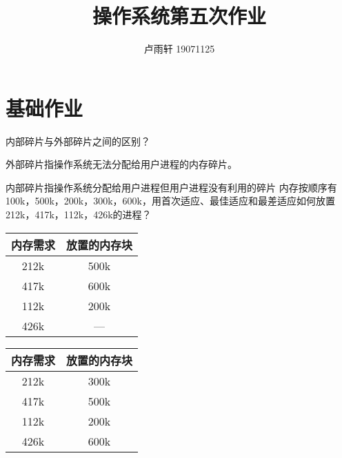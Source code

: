 \documentclass{ctexart}
\title{操作系统第五次作业}
\author{卢雨轩 19071125}
\begin{document}
\maketitle

\section*{基础作业}

\begin{outline}[enumerate]
    \1 内部碎片与外部碎片之间的区别？
        
        外部碎片指操作系统无法分配给用户进程的内存碎片。

        内部碎片指操作系统分配给用户进程但用户进程没有利用的碎片
    \1 内存按顺序有100k，500k，200k，300k，600k，用首次适应、最佳适应和最差适应如何放置212k，417k，112k，426k的进程？

        \begin{multicols}{3}
            \begin{center}
                \begin{tabular}{c c}
                    \toprule
                    内存需求 & 放置的内存块 \\
                    \midrule
                    212k & 500k \\
                    417k & 600k \\
                    112k & 200k \\
                    426k & --- \\
                    \bottomrule
                \end{tabular}
            \end{center}

            \begin{center}
                \begin{tabular}{c c}
                    \toprule
                    内存需求 & 放置的内存块 \\
                    \midrule
                    212k & 300k \\
                    417k & 500k \\
                    112k & 200k \\
                    426k & 600k \\
                    \bottomrule
                \end{tabular}
            \end{center}


\end{multicols}
\end{outline}
\end{document}
